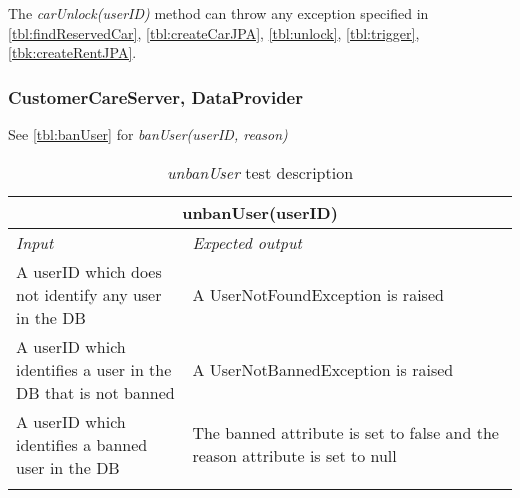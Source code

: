 The \emph{carUnlock(userID)} method can throw any exception specified in \autoref{tbl:findReservedCar}, \autoref{tbl:createCarJPA}, \autoref{tbl:unlock}, \autoref{tbl:trigger}, \autoref{tbk:createRentJPA}. 

\subsubsection{CustomerCareServer, DataProvider}
See \autoref{tbl:banUser} for \emph{banUser(userID, reason)}

\begin{longtable}{p{0.35\linewidth}p{0.65\linewidth}}
\multicolumn{2}{c}{\textbf{unbanUser(userID)}} \\
\toprule
\emph{Input} & \emph{Expected output} \\
\midrule
A userID which does not identify any user in the DB & A UserNotFoundException is raised\\
\midrule
A userID which identifies a user in the DB that is not banned & A UserNotBannedException is raised\\
\midrule
A userID which identifies a banned user in the DB & The banned attribute is set to false and the reason attribute is set to null \\
\bottomrule
\caption{\emph{unbanUser} test description}
\end{longtable}



